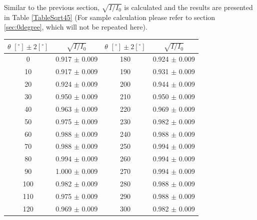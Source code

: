 \documentclass[a4paper]{article}
\begin{document}
Similar to the previous section, $\sqrt{I/I_0}$ is calculated and the results are presented in Table \ref{TableSqrt45} (For sample calculation please refer to section \ref{sec:0degree}, which will not be repeated here).

\begin{table}[H]
	\centering
	\begin{tabular}{cc||cc}
		\hline
		$\theta\,\,[^\circ] \pm 2[^\circ]$ & $\sqrt{I/I_0}$      & $\theta\,\,[^\circ] \pm 2[^\circ]$ & $\sqrt{I/I_0}$      \\
		\hline
		0                                  & 0.917   $\pm$ 0.009 & 180                                & 0.924   $\pm$ 0.009 \\
		10                                 & 0.917   $\pm$ 0.009 & 190                                & 0.931   $\pm$ 0.009 \\
		20                                 & 0.924   $\pm$ 0.009 & 200                                & 0.944   $\pm$ 0.009 \\
		30                                 & 0.950   $\pm$ 0.009 & 210                                & 0.950   $\pm$ 0.009 \\
		40                                 & 0.963   $\pm$ 0.009 & 220                                & 0.969   $\pm$ 0.009 \\
		50                                 & 0.975   $\pm$ 0.009 & 230                                & 0.982   $\pm$ 0.009 \\
		60                                 & 0.988   $\pm$ 0.009 & 240                                & 0.988   $\pm$ 0.009 \\
		70                                 & 0.988   $\pm$ 0.009 & 250                                & 0.994   $\pm$ 0.009 \\
		80                                 & 0.994   $\pm$ 0.009 & 260                                & 0.994   $\pm$ 0.009 \\
		90                                 & 1.000   $\pm$ 0.009 & 270                                & 0.994   $\pm$ 0.009 \\
		100                                & 0.982   $\pm$ 0.009 & 280                                & 0.988   $\pm$ 0.009 \\
		110                                & 0.975   $\pm$ 0.009 & 290                                & 0.988   $\pm$ 0.009 \\
		120                                & 0.969   $\pm$ 0.009 & 300                                & 0.982   $\pm$ 0.009 \\

\end{tabular}
\end{table}
\end{document}
